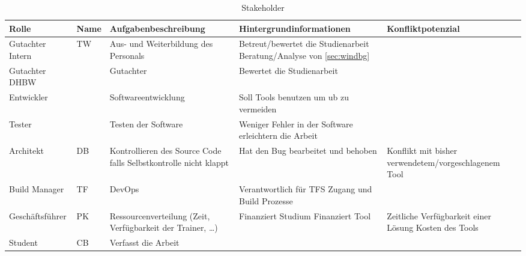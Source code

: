 \begin{table}[H]
    {
        \tiny
        \begin{tabularx}{\linewidth}{|X|X|X|X|X|}
            \hline
            Rolle
             & Name
             & Aufgabenbeschreibung
             & Hintergrundinformationen
             & Konfliktpotenzial
            \\
            \hline
            \cline{1-5}
            Gutachter Intern
             & TW
             & Aus- und Weiterbildung des Personals
             & Betreut/bewertet die Studienarbeit \newline
            Beratung/Analyse von \ref{sec:windbg}
             &
            \\
            \cline{1-5}
            Gutachter DHBW
             &
             & Gutachter
             & Bewertet die Studienarbeit
             &
            \\
            \cline{1-5}
            Entwickler
             &
             & Softwareentwicklung
             & Soll Tools benutzen um \gls{ub} zu vermeiden
             &
            \\
            \cline{1-5}
            Tester
             &
             & Testen der Software
             & Weniger Fehler in der Software erleichtern die Arbeit
             &
            \\
            \cline{1-5}
            Architekt
             & DB
             & Kontrollieren des Source Code falls Selbstkontrolle nicht klappt
             & Hat den Bug bearbeitet und behoben
             & Konflikt mit bisher verwendetem/vorgeschlagenem Tool
            \\
            \cline{1-5}
            Build Manager
             & TF
             & DevOps
             & Verantwortlich für TFS Zugang und Build Prozesse
             &
            \\
            \cline{1-5}
            Geschäftsführer
             & PK
             & Ressourcenverteilung (Zeit, Verfügbarkeit der Trainer, \dots)
             & Finanziert Studium \newline
            Finanziert Tool
             & Zeitliche Verfügbarkeit einer Lösung \newline
            Kosten des Tools
            \\
            \cline{1-5}
            Student
             & CB
             & Verfasst die Arbeit
             &
             &
            \\
            \hline
        \end{tabularx}
    }
    \caption{Stakeholder}
    \label{tab:stakeholder}
\end{table}